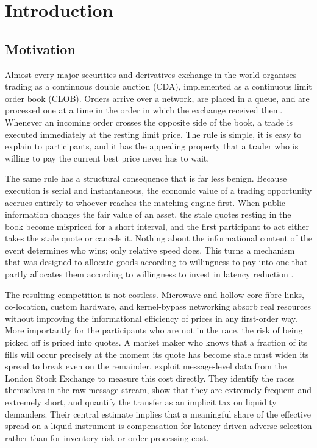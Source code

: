 \chapter{Introduction}
\label{ch:introduction}

\section{Motivation}
\label{sec:motivation}

Almost every major securities and derivatives exchange in the world
organises trading as a continuous double auction (CDA), implemented as a
continuous limit order book (CLOB). Orders arrive over a network, are
placed in a queue, and are processed one at a time in the order in which
the exchange received them. Whenever an incoming order crosses the
opposite side of the book, a trade is executed immediately at the
resting limit price. The rule is simple, it is easy to explain to
participants, and it has the appealing property that a trader who is
willing to pay the current best price never has to wait.

The same rule has a structural consequence that is far less benign.
Because execution is serial and instantaneous, the economic value of a
trading opportunity accrues entirely to whoever reaches the matching
engine first. When public information changes the fair value of an
asset, the stale quotes resting in the book become mispriced for a short
interval, and the first participant to act either takes the stale quote
or cancels it. Nothing about the informational content of the event
determines who wins; only relative speed does. This turns a mechanism
that was designed to allocate goods according to willingness to pay into
one that partly allocates them according to willingness to invest in
latency reduction \citep{budish2015hft}.

The resulting competition is not costless. Microwave and hollow-core
fibre links, co-location, custom hardware, and kernel-bypass networking
absorb real resources without improving the informational efficiency of
prices in any first-order way. More importantly for the participants who
are not in the race, the risk of being picked off is priced into
quotes. A market maker who knows that a fraction of its fills will occur
precisely at the moment its quote has become stale must widen its spread
to break even on the remainder. 
\citet{aquilina2022quantifying} exploit
message-level data from the London Stock Exchange to measure this cost
directly. They identify the races themselves in the raw message stream,
show that they are extremely frequent and extremely short, and quantify
the transfer as an implicit tax on liquidity demanders. Their central
estimate implies that a meaningful share of the effective spread on a
liquid instrument is compensation for latency-driven adverse selection
rather than for inventory risk or order processing cost.

